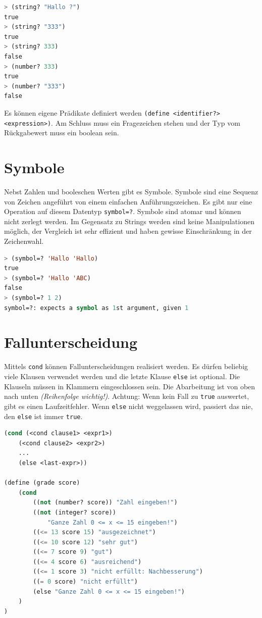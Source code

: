 \begin{lstlisting}[language=Lisp, caption=Prädikatsfunktionen]
> (string? "Hallo ?")
true
> (string? "333")
true
> (string? 333)
false
> (number? 333)
true
> (number? "333")
false
\end{lstlisting}

Es können eigene Prädikate definiert werden \verb|(define <identifier?> <expression>)|. Am Schluss muss ein Fragezeichen stehen und der Typ vom Rückgabewert muss ein boolean sein.

\section{Symbole}
Nebst Zahlen und booleschen Werten gibt es Symbole. Symbole sind eine Sequenz von Zeichen angeführt von einem einfachen Anführungszeichen. Es gibt nur eine Operation auf diesem Datentyp \verb|symbol=?|. Symbole sind atomar und können nicht zerlegt werden. Im Gegensatz zu Strings werden sind keine Manipulationen möglich, der Vergleich ist sehr effizient und haben gewisse Einschränkung in der Zeichenwahl.

\begin{lstlisting}[language=Lisp, caption=Symbole]
> (symbol=? 'Hallo 'Hallo)
true
> (symbol=? 'Hallo 'ABC)
false
> (symbol=? 1 2)
symbol=?: expects a symbol as 1st argument, given 1
\end{lstlisting}

\section{Fallunterscheidung}
Mittels \verb|cond| können Fallunterscheidungen realisiert werden. Es dürfen beliebig viele Klausen verwendet werden und die letzte Klause \verb|else| ist optional. Die Klauseln müssen in Klammern eingeschlossen sein. Die Abarbeitung ist von oben nach unten \emph{(Reihenfolge wichtig!)}. Achtung: Wenn kein Fall zu \verb|true| auswertet, gibt es einen Laufzeitfehler. Wenn \verb|else| nicht weggelassen wird, passiert das nie, den \verb|else| ist immer \verb|true|. 

\begin{lstlisting}[language=Lisp, caption=Fallunterscheidung]
(cond (<cond clause1> <expr1>)
	(<cond clause2> <expr2>)
	...
	(else <last-expr>))
	
(define (grade score)
	(cond
		((not (number? score)) "Zahl eingeben!")
		((not (integer? score))
			"Ganze Zahl 0 <= x <= 15 eingeben!")
		((<= 13 score 15) "ausgezeichnet")
		((<= 10 score 12) "sehr gut")
		((<= 7 score 9) "gut")
		((<= 4 score 6) "ausreichend")
		((<= 1 score 3) "nicht erfüllt: Nachbesserung")
		((= 0 score) "nicht erfüllt")
		(else "Ganze Zahl 0 <= x <= 15 eingeben!")
	)
)
\end{lstlisting}

